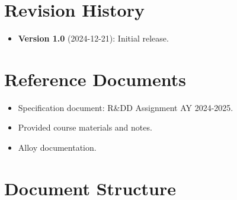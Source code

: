 \section{Revision History}
\label{sec:revision-history}%

\begin{itemize}
    \item \textbf{Version 1.0} (2024-12-21): Initial release.
\end{itemize}

\section{Reference Documents}
\label{sec:reference-documents}%

\begin{itemize}
    \item Specification document: R\&DD Assignment AY 2024-2025.
    \item Provided course materials and notes.
    \item Alloy documentation.
\end{itemize}

\section{Document Structure}
\label{sec:document-structure}%


